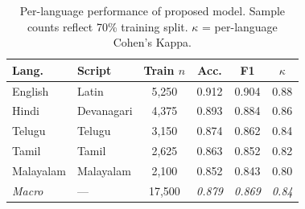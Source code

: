 \begin{table}[htbp]
\caption{Per-language performance of proposed model.
         Sample counts reflect 70\% training split.
         $\kappa$ = per-language Cohen's Kappa.}
\centering
\small
\setlength{\tabcolsep}{3.5pt}
\renewcommand{\arraystretch}{1.15}
\begin{tabular}{llcccc}
\toprule
\rowcolor{headerblue}
\textbf{Lang.} & \textbf{Script}
& \textbf{Train $n$} & \textbf{Acc.}
& \textbf{F1} & \textbf{$\kappa$} \\
\midrule
English   & Latin       & 5,250 & 0.912 & 0.904 & 0.88 \\
Hindi     & Devanagari  & 4,375 & 0.893 & 0.884 & 0.86 \\
Telugu    & Telugu      & 3,150 & 0.874 & 0.862 & 0.84 \\
Tamil     & Tamil       & 2,625 & 0.863 & 0.852 & 0.82 \\
Malayalam & Malayalam   & 2,100 & 0.852 & 0.843 & 0.80 \\
\midrule
\rowcolor{toprow}
\textit{Macro} & ---
    & 17,500 & \textit{0.879}
    & \textit{0.869} & \textit{0.84} \\
\bottomrule
\end{tabular}
\label{tab:language}
\end{table}

